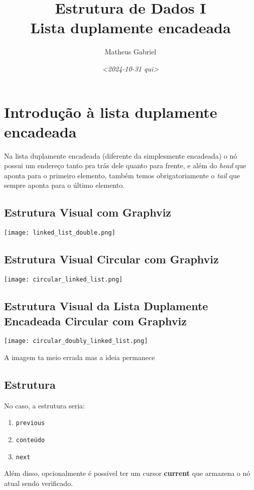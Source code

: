 \documentclass[11pt]{article}
\author{Matheus Gabriel}
\date{\textit{<2024-10-31 qui>}}
\title{Estrutura de Dados I\\\medskip
\large Lista duplamente encadeada}
\begin{document}
\maketitle
\tableofcontents

\section{Introdução à lista duplamente encadeada}
\label{sec:orgb87dddc}

Na lista duplamente encadeada (diferente da simplesmente encadeada) o nó possui um endereço tanto pra trás dele quanto para frente, e além do \emph{head} que aponta para o primeiro elemento, também temos obrigatoriamente o \emph{tail} que sempre aponta para o último elemento.
\subsection{Estrutura Visual com Graphviz}
\label{sec:org7d7e243}

\begin{center}
\texttt{[image: linked\_list\_double.png]}
\label{}
\end{center}
\subsection{Estrutura Visual Circular com Graphviz}
\label{sec:org36f1bfb}

\begin{center}
\texttt{[image: circular\_linked\_list.png]}
\label{}
\end{center}
\subsection{Estrutura Visual da Lista Duplamente Encadeada Circular com Graphviz}
\label{sec:orgd5accfd}

\begin{center}
\texttt{[image: circular\_doubly\_linked\_list.png]}
\label{}
\end{center}

A imagem ta meio errada mas a ideia permanece
\subsection{Estrutura}
\label{sec:org0e57cab}

No caso, a estrutura seria:
\begin{enumerate}
\item \texttt{previous}
\item \texttt{conteúdo}
\item \texttt{next}
\end{enumerate}
Além disso, opcionalmente é possivel ter um cursor \textbf{current} que armazena o nó atual sendo verificado.
\end{document}
